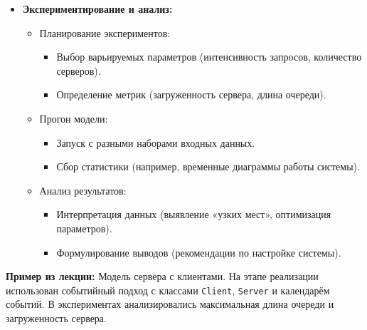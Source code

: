 \begin{itemize}
    \item \textbf{Экспериментирование и анализ:}
        \begin{itemize}
            \item Планирование экспериментов:
                \begin{itemize}
                    \item Выбор варьируемых параметров (интенсивность запросов, количество серверов).
                    \item Определение метрик (загруженность сервера, длина очереди).
                \end{itemize}
            \item Прогон модели:
                \begin{itemize}
                    \item Запуск с разными наборами входных данных.
                    \item Сбор статистики (например, временные диаграммы работы системы).
                \end{itemize}
            \item Анализ результатов:
                \begin{itemize}
                    \item Интерпретация данных (выявление «узких мест», оптимизация параметров).
                    \item Формулирование выводов (рекомендации по настройке системы).
                \end{itemize}
        \end{itemize}
\end{itemize}

\textbf{Пример из лекции:} Модель сервера с клиентами.
На этапе реализации использован событийный подход с классами \texttt{Client},
\texttt{Server} и календарём событий.
В экспериментах анализировались максимальная длина очереди и загруженность сервера.

